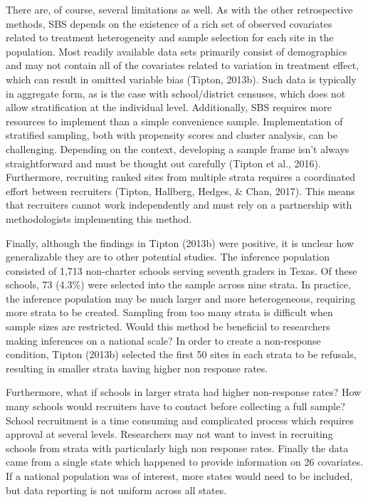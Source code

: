 \documentclass[man,floatsintext]{apa6}
\begin{document}
There are, of course, several limitations as well. As with the other retrospective methods, SBS depends on the existence of a rich set of observed covariates related to treatment heterogeneity and sample selection for each site in the population. Most readily available data sets primarily consist of demographics and may not contain all of the covariates related to variation in treatment effect, which can result in omitted variable bias (Tipton, 2013b). Such data is typically in aggregate form, as is the case with school/district censuses, which does not allow stratification at the individual level. Additionally, SBS requires more resources to implement than a simple convenience sample. Implementation of stratified sampling, both with propensity scores and cluster analysis, can be challenging. Depending on the context, developing a sample frame isn't always straightforward and must be thought out carefully (Tipton et al., 2016). Furthermore, recruiting ranked sites from multiple strata requires a coordinated effort between recruiters (Tipton, Hallberg, Hedges, \& Chan, 2017). This means that recruiters cannot work independently and must rely on a partnership with methodologists implementing this method.

Finally, although the findings in Tipton (2013b) were positive, it is unclear how generalizable they are to other potential studies. The inference population consisted of 1,713 non-charter schools serving seventh graders in Texas. Of these schools, 73 (4.3\%) were selected into the sample across nine strata. In practice, the inference population may be much larger and more heterogeneous, requiring more strata to be created. Sampling from too many strata is difficult when sample sizes are restricted. Would this method be beneficial to researchers making inferences on a national scale? In order to create a non-response condition, Tipton (2013b) selected the first 50 sites in each strata to be refusals, resulting in smaller strata having higher non response rates.

Furthermore, what if schools in larger strata had higher non-response rates? How many schools would recruiters have to contact before collecting a full sample? School recruitment is a time consuming and complicated process which requires approval at several levels. Researchers may not want to invest in recruiting schools from strata with particularly high non response rates. Finally the data came from a single state which happened to provide information on 26 covariates. If a national population was of interest, more states would need to be included, but data reporting is not uniform across all states.
\end{document}
